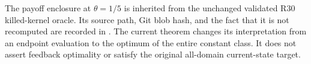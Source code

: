 The payoff enclosure at $\theta=1/5$ is inherited from the unchanged validated R30 killed-kernel oracle. Its source path, Git blob hash, and the fact that it is not recomputed are recorded in . The current theorem changes its interpretation from an endpoint evaluation to the optimum of the entire constant class. It does not assert feedback optimality or satisfy the original all-domain current-state target.

